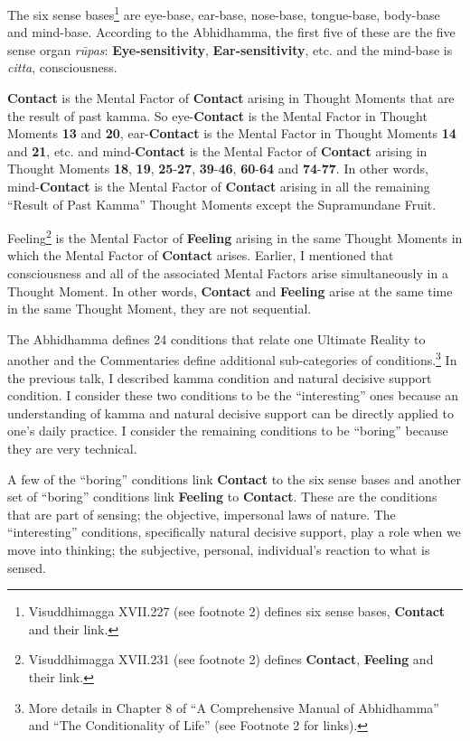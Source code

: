The six sense bases\footnote{Visuddhimagga XVII.227 (see footnote 2) defines six sense bases, \textbf{Contact} and their link.} are eye-base, ear-base, nose-base, tongue-base, body-base and mind-base. According to the Abhidhamma, the first five of these are the five sense organ \textit{rūpas}: \textbf{Eye-sensitivity}, \textbf{Ear-sensitivity}, etc. and the mind-base is \textit{citta}, consciousness.

\textbf{Contact} is the Mental Factor of \textbf{Contact} arising in Thought Moments that are the result of past kamma. So eye-\textbf{Contact} is the Mental Factor in Thought Moments \textbf{13} and \textbf{20}, ear-\textbf{Contact} is the Mental Factor in Thought Moments \textbf{14} and \textbf{21}, etc. and mind-\textbf{Contact} is the Mental Factor of \textbf{Contact} arising in Thought Moments \textbf{18}, \textbf{19}, \textbf{25}-\textbf{27}, \textbf{39}-\textbf{46}, \textbf{60}-\textbf{64} and \textbf{74}-\textbf{77}. In other words, mind-\textbf{Contact} is the Mental Factor of \textbf{Contact} arising in all the remaining “Result of Past Kamma” Thought Moments except the Supramundane Fruit.

Feeling\footnote{Visuddhimagga XVII.231 (see footnote 2) defines \textbf{Contact}, \textbf{Feeling} and their link.} is the Mental Factor of \textbf{Feeling} arising in the same Thought Moments in which the Mental Factor of \textbf{Contact} arises. Earlier, I mentioned that consciousness and all of the associated Mental Factors arise simultaneously in a Thought Moment. In other words, \textbf{Contact} and \textbf{Feeling} arise at the same time in the same Thought Moment, they are not sequential.

The Abhidhamma defines 24 conditions that relate one Ultimate Reality to another and the Commentaries define additional sub-categories of conditions.\footnote{More details in Chapter 8 of “A Comprehensive Manual of Abhidhamma” and “The Conditionality of Life” (see Footnote 2 for links).} In the previous talk, I described kamma condition and natural decisive support condition. I consider these two conditions to be the “interesting” ones because an understanding of kamma and natural decisive support can be directly applied to one’s daily practice. I consider the remaining conditions to be “boring” because they are very technical.

A few of the “boring” conditions link \textbf{Contact} to the six sense bases and another set of “boring” conditions link \textbf{Feeling} to \textbf{Contact}. These are the conditions that are part of sensing; the objective, impersonal laws of nature. The “interesting” conditions, specifically natural decisive support, play a role when we move into thinking; the subjective, personal, individual’s reaction to what is sensed.

